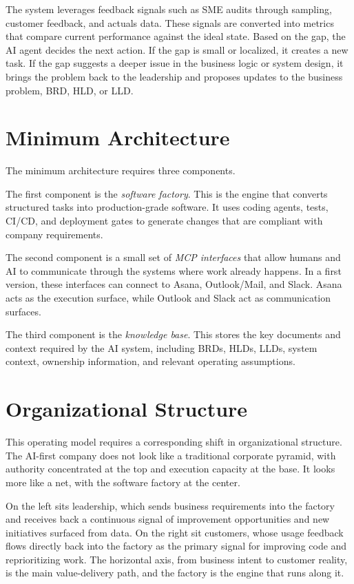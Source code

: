 The system leverages feedback signals such as SME audits through sampling, customer feedback, and actuals data. These signals are converted into metrics that compare current performance against the ideal state. Based on the gap, the AI agent decides the next action. If the gap is small or localized, it creates a new task. If the gap suggests a deeper issue in the business logic or system design, it brings the problem back to the leadership and proposes updates to the business problem, BRD, HLD, or LLD.

\section{Minimum Architecture}

The minimum architecture requires three components.

The first component is the \textit{software factory}. This is the engine that converts structured tasks into production-grade software. It uses coding agents, tests, CI/CD, and deployment gates to generate changes that are compliant with company requirements.

The second component is a small set of \textit{MCP interfaces} that allow humans and AI to communicate through the systems where work already happens. In a first version, these interfaces can connect to Asana, Outlook/Mail, and Slack. Asana acts as the execution surface, while Outlook and Slack act as communication surfaces.

The third component is the \textit{knowledge base}. This stores the key documents and context required by the AI system, including BRDs, HLDs, LLDs, system context, ownership information, and relevant operating assumptions.

\section{Organizational Structure}

This operating model requires a corresponding shift in organizational structure. The AI-first company does not look like a traditional corporate pyramid, with authority concentrated at the top and execution capacity at the base. It looks more like a net, with the software factory at the center.

On the left sits leadership, which sends business requirements into the factory and receives back a continuous signal of improvement opportunities and new initiatives surfaced from data. On the right sit customers, whose usage feedback flows directly back into the factory as the primary signal for improving code and reprioritizing work. The horizontal axis, from business intent to customer reality, is the main value-delivery path, and the factory is the engine that runs along it.

